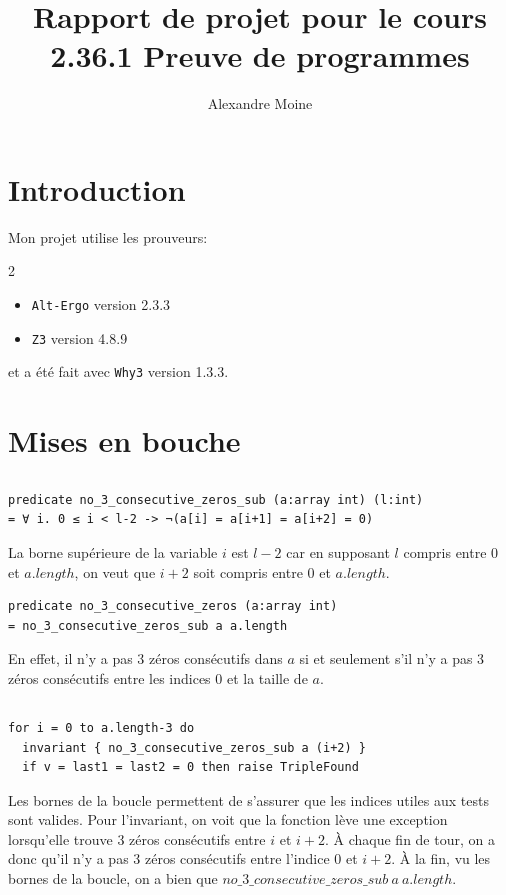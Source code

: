 ﻿\documentclass[10pt,a4paper]{article}
\author{Alexandre Moine}
\title{Rapport de projet pour le cours\\2.36.1 Preuve de programmes}
\begin{document}
\maketitle

\section{Introduction}
Mon projet utilise les prouveurs:
\begin{multicols}{2}
\begin{itemize}
\item \verb|Alt-Ergo| version 2.3.3
\item \verb|Z3| version 4.8.9
\end{itemize}
\end{multicols}
et a été fait avec \verb|Why3| version 1.3.3.

\section{Mises en bouche}

\subsection{}
\begin{verbatim}
predicate no_3_consecutive_zeros_sub (a:array int) (l:int)
= ∀ i. 0 ≤ i < l-2 -> ¬(a[i] = a[i+1] = a[i+2] = 0)
\end{verbatim}
La borne supérieure de la variable $i$ est $l-2$ car en supposant $l$ compris entre $0$ et $a.length$, on veut que $i+2$ soit compris entre $0$ et $a.length$.

\begin{verbatim}
predicate no_3_consecutive_zeros (a:array int)
= no_3_consecutive_zeros_sub a a.length
\end{verbatim}
En effet, il n'y a pas 3 zéros consécutifs dans $a$ si et seulement s'il n'y a pas 3 zéros consécutifs entre les indices $0$ et la taille de $a$.

\subsection{}
\begin{verbatim}
for i = 0 to a.length-3 do
  invariant { no_3_consecutive_zeros_sub a (i+2) }
  if v = last1 = last2 = 0 then raise TripleFound
\end{verbatim}
Les bornes de la boucle permettent de s'assurer que les indices utiles aux tests sont valides. Pour l'invariant, on voit que la fonction lève une exception lorsqu'elle trouve 3 zéros consécutifs entre $i$ et $i+2$. À chaque fin de tour, on a donc qu'il n'y a pas 3 zéros consécutifs entre l'indice $0$ et $i+2$. À la fin, vu les bornes de la boucle, on a bien que $no\_3\_consecutive\_zeros\_sub\ a\ a.length$.
\end{document}

